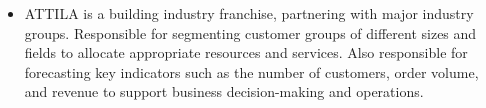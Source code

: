 \documentclass{mycv}
\begin{document}
\begin{positions}
\end{positions}

\begin{itemize}
  \itemsep 0.3em
  \item ATTILA is a building industry franchise, partnering with major industry groups. Responsible for segmenting customer groups of different sizes and fields to allocate appropriate resources and services. Also responsible for forecasting key indicators such as the number of customers, order volume, and revenue to support business decision-making and operations.
\end{itemize}

\vspace{-\parskip}




\vspace{-\parskip}



\end{document}
